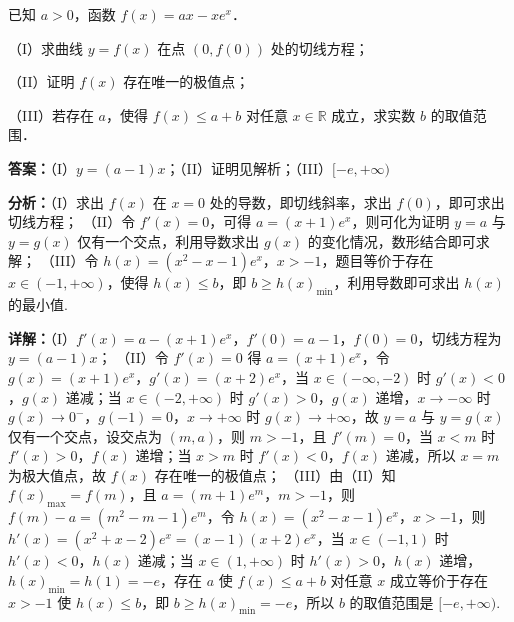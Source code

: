 \begin{question}[points=16]
已知 $a > 0$，函数 $f(x) = ax - xe^x$．

（I）求曲线 $y = f(x)$ 在点 $(0, f(0))$ 处的切线方程；

（II）证明 $f(x)$ 存在唯一的极值点；

（III）若存在 $a$，使得 $f(x) \le a + b$ 对任意 $x \in \mathbb{R}$ 成立，求实数 $b$ 的取值范围．
\begin{solution}
\textbf{答案：}（I）$y = (a-1)x$；（II）证明见解析；（III）$[-e, +\infty)$

\textbf{分析：}（I）求出 $f(x)$ 在 $x=0$ 处的导数，即切线斜率，求出 $f(0)$，即可求出切线方程；
（II）令 $f'(x)=0$，可得 $a = (x+1)e^x$，则可化为证明 $y=a$ 与 $y=g(x)$ 仅有一个交点，利用导数求出 $g(x)$ 的变化情况，数形结合即可求解；
（III）令 $h(x) = (x^2 - x - 1)e^x$，$x > -1$，题目等价于存在 $x \in (-1, +\infty)$，使得 $h(x) \le b$，即 $b \ge h(x)_{\min}$，利用导数即可求出 $h(x)$ 的最小值.

\textbf{详解：}（I）$f'(x) = a - (x+1)e^x$，$f'(0) = a-1$，$f(0)=0$，切线方程为 $y = (a-1)x$；
（II）令 $f'(x)=0$ 得 $a = (x+1)e^x$，令 $g(x) = (x+1)e^x$，$g'(x) = (x+2)e^x$，当 $x \in (-\infty, -2)$ 时 $g'(x)<0$，$g(x)$ 递减；当 $x \in (-2, +\infty)$ 时 $g'(x)>0$，$g(x)$ 递增，$x \to -\infty$ 时 $g(x) \to 0^-$，$g(-1)=0$，$x \to +\infty$ 时 $g(x) \to +\infty$，故 $y=a$ 与 $y=g(x)$ 仅有一个交点，设交点为 $(m, a)$，则 $m > -1$，且 $f'(m)=0$，当 $x < m$ 时 $f'(x)>0$，$f(x)$ 递增；当 $x > m$ 时 $f'(x)<0$，$f(x)$ 递减，所以 $x=m$ 为极大值点，故 $f(x)$ 存在唯一的极值点；
（III）由（II）知 $f(x)_{\max} = f(m)$，且 $a = (m+1)e^m$，$m>-1$，则 $f(m)-a = (m^2 - m -1)e^m$，令 $h(x) = (x^2 - x - 1)e^x$，$x>-1$，则 $h'(x) = (x^2 + x -2)e^x = (x-1)(x+2)e^x$，当 $x \in (-1,1)$ 时 $h'(x)<0$，$h(x)$ 递减；当 $x \in (1, +\infty)$ 时 $h'(x)>0$，$h(x)$ 递增，$h(x)_{\min} = h(1) = -e$，存在 $a$ 使 $f(x) \le a+b$ 对任意 $x$ 成立等价于存在 $x>-1$ 使 $h(x) \le b$，即 $b \ge h(x)_{\min} = -e$，所以 $b$ 的取值范围是 $[-e, +\infty)$.
\end{solution}
\end{question}

